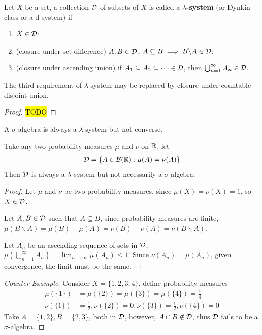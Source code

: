 \documentclass[11pt]{article}
\begin{document}
	\begin{definition}
		Let $X$ be a set, a collection $\mathcal{{D}}$ of subsets of $X$ is called a \textbf{$\lambda$-system} (or Dynkin class or a d-system) if 
		\begin{enumerate}
			\item $X \in \mathcal{{D}}$;
			\item (closure under set difference) $A, B \in \mathcal{{D}}$, $A \subseteq B \implies B \backslash A \in \mathcal{{D}}$;
			\item (closure under ascending union) if $A_1 \subseteq A_2 \subseteq \dots \in \mathcal{{D}}$, then $\bigcup_{n=1}^\infty A_n \in \mathcal{{D}}$.
		\end{enumerate}
	\end{definition}
	
	\begin{remark}
		The third requirement of $\lambda$-system may be replaced by closure under countable disjoint union.
		\begin{proof}
			\hl{TODO}
		\end{proof}
	\end{remark}
	
	\begin{remark}
		A $\sigma$-algebra is always a $\lambda$-system but not converse.
	\end{remark}
	
	\begin{example}
		Take any two probability measures $\mu$ and $\nu$ on $\mathbb{R}$, let
		\begin{align}
			\mathcal{{D}} = \{A \in \mathcal{{B}}(\mathbb{R}) : \mu(A) = \nu(A)\}	
		\end{align}
		Then $\mathcal{{D}}$ is always a $\lambda$-system but not necessarily a $\sigma$-algebra:
		\begin{proof}
			Let $\mu$ and $\nu$ be two probability measures, since $\mu(X) = \nu(X) = 1$, so $X \in \mathcal{{D}}$.
			
			Let $A, B \in \mathcal{{D}}$ such that $A \subseteq B$, since probability measures are finite, $\mu(B \backslash A) = \mu(B) - \mu(A) = \nu(B) - \nu(A) = \nu(B \backslash A)$.
			
			Let $A_n$ be an ascending sequence of sets in $\mathcal{{D}}$, $\mu(\bigcup_{n=1}^\infty A_n) = \lim_{n \to \infty} \mu(A_n) \leq 1$. Since $\nu(A_n) = \mu(A_n)$, given convergence, the limit must be the same.
		\end{proof}
		\begin{proof}[Counter-Example]
			Consider $X = \{1,2,3,4\}$, define probability measures
			\begin{align}
				\mu(\{1\}) &= \mu(\{2\}) = \mu(\{3\}) = \mu(\{4\}) = \frac{1}{4} \\
				\nu(\{1\}) &= \frac{1}{2}, \nu(\{2\}) = 0, \nu(\{3\}) = \frac{1}{2}, \nu(\{4\}) = 0
			\end{align}
			Take $A = \{1,2\}, B = \{2, 3\}$, both in $\mathcal{{D}}$, however, $A \cap B \notin \mathcal{{D}}$, thus $\mathcal{{D}}$ fails to be a $\sigma$-algebra.
		\end{proof}
	\end{example}
	
\end{document}
